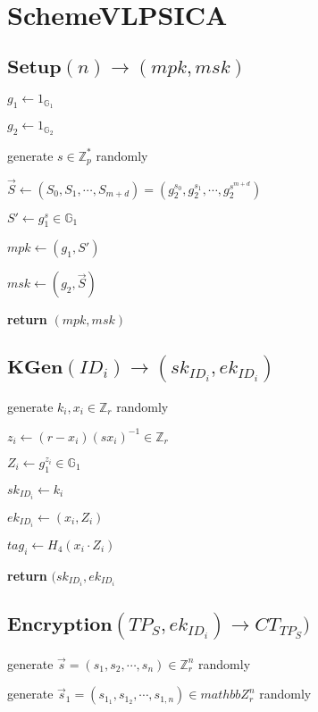 \documentclass[a4paper]{article}
\begin{document}
\section{SchemeVLPSICA}

\subsection{$\textbf{Setup}(n) \rightarrow (\textit{mpk}, \textit{msk})$}

$g_1 \gets 1_{\mathbb{G}_1}$

$g_2 \gets 1_{\mathbb{G}_2}$

generate $s \in \mathbb{Z}_p^*$ randomly

$\vec{S} \gets (S_0, S_1, \cdots, S_{m + d}) = (g_2^{s_0}, g_2^{s_1}, \cdots, g_2^{s^{m + d}})$

$S' \gets g_1^s \in \mathbb{G}_1$

$\textit{mpk} \gets (g_1, S')$

$\textit{msk} \gets (g_2, \vec{S})$

\textbf{return} $(\textit{mpk}, \textit{msk})$

\subsection{$\textbf{KGen}(\textit{ID}_i) \rightarrow (\textit{sk}_{\textit{ID}_i}, \textit{ek}_{\textit{ID}_i})$}

generate $k_i, x_i \in \mathbb{Z}_r$ randomly

$z_i \gets (r - x_i)(s x_i)^{-1} \in \mathbb{Z}_r$

$Z_i \gets g_1^{z_i} \in \mathbb{G}_1$

$\textit{sk}_{\textit{ID}_i} \gets k_i$

$\textit{ek}_{\textit{ID}_i} \gets (x_i, Z_i)$

$\textit{tag}_i \gets H_4(x_i \cdot Z_i)$

\textbf{return} $(\textit{sk}_{\textit{ID}_i}, \textit{ek}_{\textit{ID}_i}$

\subsection{$\textbf{Encryption}(\textit{TP}_S, \textit{ek}_{\textit{ID}_i}) \rightarrow \textit{CT}_{\textit{TP}_S})$}

generate $\vec{s} = (s_1, s_2, \cdots, s_n) \in \mathbb{Z}_r^n$ randomly

generate $\vec{s}_1 = (s_{1_1}, s_{1_2}, \cdots, s_{1, n}) \in mathbb{Z}_r^n$ randomly
\end{document}
